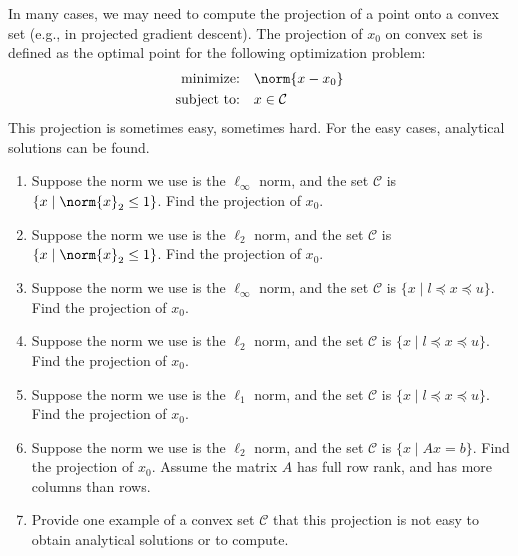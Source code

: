 \documentclass[11pt]{article}
\begin{document}
\makeAssignmentTitle


\begin{homeworkProblem}

    In many cases, we may need to compute the projection of a point onto a convex set (e.g.,
    in projected gradient descent). The projection of $x_0$ on convex set is defined as the optimal
    point for the following optimization problem:
    \begin{align*}
        \text{minimize:} \quad   & \norm{x - x_0}    \\
        \text{subject to:} \quad & x \in \mathcal{C}
    \end{align*}
    This projection is sometimes easy, sometimes hard. For the easy cases, analytical solutions
    can be found.
    \begin{enumerate}[label=(\alph*), topsep=5pt, itemsep=5pt]
        \item Suppose the norm we use is the $\ell_\infty$ norm, and the set $\mathcal{C}$ is $\{ x \mid \norm{x}_2 \leq 1 \}$.
              Find the projection of $x_0$.
        \item Suppose the norm we use is the $\ell_2$ norm, and the set $\mathcal{C}$ is $\{ x \mid \norm{x}_2 \leq 1 \}$.
              Find the projection of $x_0$.
        \item Suppose the norm we use is the $\ell_\infty$ norm, and the set $\mathcal{C}$ is $\{ x \mid l \preceq x \preceq u \}$.
              Find the projection of $x_0$.
        \item Suppose the norm we use is the $\ell_2$ norm, and the set $\mathcal{C}$ is $\{ x \mid l \preceq x \preceq u \}$.
              Find the projection of $x_0$.
        \item Suppose the norm we use is the $\ell_1$ norm, and the set $\mathcal{C}$ is $\{ x \mid l \preceq x \preceq u \}$.
              Find the projection of $x_0$.
        \item Suppose the norm we use is the $\ell_2$ norm, and the set $\mathcal{C}$ is $\{ x \mid Ax = b \}$. Find the projection
              of $x_0$. Assume the matrix $A$ has full row rank, and has more columns than rows.
        \item Provide one example of a convex set $\mathcal{C}$ that this projection is not easy to obtain analytical
              solutions or to compute. \newline
    \end{enumerate}
    \solution


\end{homeworkProblem}
\end{document}
